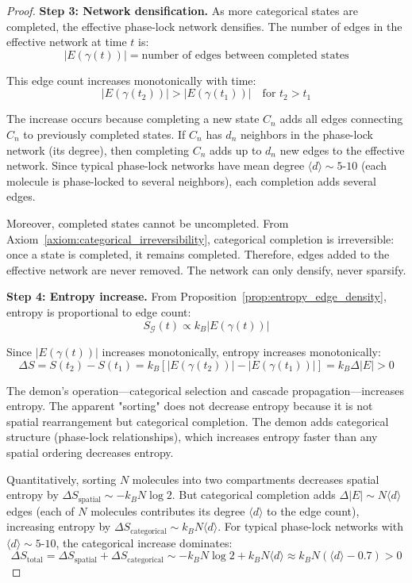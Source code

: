 \documentclass[12pt,a4paper]{article}
\theoremstyle{definition}
\theoremstyle{remark}
\newcommand{\phaselockgraph}{\mathcal{G}}
\begin{document}
\begin{proof}
\textbf{Step 3: Network densification.}
As more categorical states are completed, the effective phase-lock network densifies. The number of edges in the effective network at time $t$ is:
\begin{equation}
|E(\gamma(t))| = \text{number of edges between completed states}
\end{equation}

This edge count increases monotonically with time:
\begin{equation}
|E(\gamma(t_2))| > |E(\gamma(t_1))| \quad \text{for } t_2 > t_1
\end{equation}

The increase occurs because completing a new state $C_n$ adds all edges connecting $C_n$ to previously completed states. If $C_n$ has $d_n$ neighbors in the phase-lock network (its degree), then completing $C_n$ adds up to $d_n$ new edges to the effective network. Since typical phase-lock networks have mean degree $\langle d \rangle \sim 5$-$10$ (each molecule is phase-locked to several neighbors), each completion adds several edges.

Moreover, completed states cannot be uncompleted. From Axiom~\ref{axiom:categorical_irreversibility}, categorical completion is irreversible: once a state is completed, it remains completed. Therefore, edges added to the effective network are never removed. The network can only densify, never sparsify.

\textbf{Step 4: Entropy increase.}
From Proposition~\ref{prop:entropy_edge_density}, entropy is proportional to edge count:
\begin{equation}
S_{\phaselockgraph}(t) \propto k_B |E(\gamma(t))|
\end{equation}

Since $|E(\gamma(t))|$ increases monotonically, entropy increases monotonically:
\begin{equation}
\Delta S = S(t_2) - S(t_1) = k_B [|E(\gamma(t_2))| - |E(\gamma(t_1))|] = k_B \Delta |E| > 0
\end{equation}

The demon's operation—categorical selection and cascade propagation—increases entropy. The apparent "sorting" does not decrease entropy because it is not spatial rearrangement but categorical completion. The demon adds categorical structure (phase-lock relationships), which increases entropy faster than any spatial ordering decreases entropy.

Quantitatively, sorting $N$ molecules into two compartments decreases spatial entropy by $\Delta S_{\text{spatial}} \sim -k_B N \log 2$. But categorical completion adds $\Delta |E| \sim N \langle d \rangle$ edges (each of $N$ molecules contributes its degree $\langle d \rangle$ to the edge count), increasing entropy by $\Delta S_{\text{categorical}} \sim k_B N \langle d \rangle$. For typical phase-lock networks with $\langle d \rangle \sim 5$-$10$, the categorical increase dominates:
\begin{equation}
\Delta S_{\text{total}} = \Delta S_{\text{spatial}} + \Delta S_{\text{categorical}} \sim -k_B N \log 2 + k_B N \langle d \rangle \approx k_B N (\langle d \rangle - 0.7) > 0
\end{equation}


\end{proof}
\end{document}
